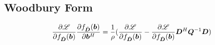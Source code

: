 \begin{appendices}
\subsection{Woodbury Form}
\begin{equation}
\frac{\partial \mathscr{L}}{\partial f_{\hat{\bm{D}}}(\bm{b})}\frac{\partial f_{\hat{\bm{D}}}(\bm{b})}{\partial \bm{b}^H} = \frac{1}{\rho}(\frac{\partial \mathscr{L}}{\partial f_{\hat{\bm{D}}}(\bm{b})} - \frac{\partial \mathscr{L}}{\partial f_{\hat{\bm{D}}}(\bm{b})}\bm{D}^H\bm{Q}^{-1}\bm{D})
\end{equation}

\end{appendices}
